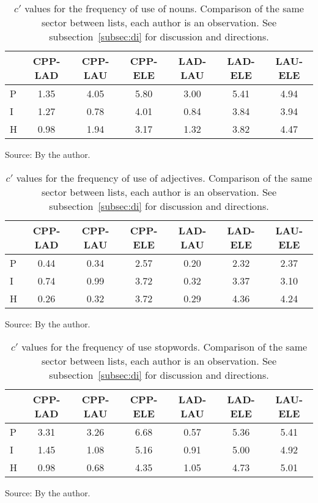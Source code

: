 \begin{table}
  \centering
  \caption{$c'$ values for the frequency of use of nouns. Comparison of the same sector between lists, each author is an observation. See subsection~\ref{subsec:di} for discussion and directions.}
    \small
\setlength{\tabcolsep}{.06667em}
  \begin{tabular}{l|| c|c|c|c|c|c}\hline
& CPP-LAD & CPP-LAU & CPP-ELE & LAD-LAU & LAD-ELE & LAU-ELE \\\hline\hline
P & 1.35 & 4.05 & 5.80 & 3.00 & 5.41 & 4.94 \\\hline
I & 1.27 & 0.78 & 4.01 & 0.84 & 3.84 & 3.94 \\\hline
H & 0.98 & 1.94 & 3.17 & 1.32 & 3.82 & 4.47 \\\hline
  \end{tabular}
\begin{flushleft}\footnotesize
		Source: By the author.\
\end{flushleft}
  \label{tab:kolSubInter}
\end{table}

\begin{table}
  \centering
  \caption{$c'$ values for the frequency of use of adjectives. Comparison of the same sector between lists, each author is an observation. See subsection~\ref{subsec:di} for discussion and directions.}
    \small
\setlength{\tabcolsep}{.06667em}
  \begin{tabular}{l|| c|c|c|c|c|c}\hline
 & CPP-LAD & CPP-LAU & CPP-ELE & LAD-LAU & LAD-ELE & LAU-ELE \\\hline\hline
P & 0.44 & 0.34 & 2.57 & 0.20 & 2.32 & 2.37 \\\hline
I & 0.74 & 0.99 & 3.72 & 0.32 & 3.37 & 3.10 \\\hline
H & 0.26 & 0.32 & 3.72 & 0.29 & 4.36 & 4.24 \\\hline
  \end{tabular}
\begin{flushleft}\footnotesize
		Source: By the author.\
\end{flushleft}
  \label{tab:kolAdjInter}
\end{table}

\begin{table}
  \centering
  \caption{$c'$ values for the frequency of use stopwords. Comparison of the same sector between lists, each author is an observation. See subsection~\ref{subsec:di} for discussion and directions.}
    \small
\setlength{\tabcolsep}{.06667em}
  \begin{tabular}{l|| c|c|c|c|c|c}\hline
 & CPP-LAD & CPP-LAU & CPP-ELE & LAD-LAU & LAD-ELE & LAU-ELE \\\hline\hline
P & 3.31 & 3.26 & 6.68 & 0.57 & 5.36 & 5.41 \\\hline
I & 1.45 & 1.08 & 5.16 & 0.91 & 5.00 & 4.92 \\\hline
H & 0.98 & 0.68 & 4.35 & 1.05 & 4.73 & 5.01 \\\hline
  \end{tabular}
\begin{flushleft}\footnotesize
		Source: By the author.\
\end{flushleft}
  \label{tab:kolSwInter}
\end{table}

